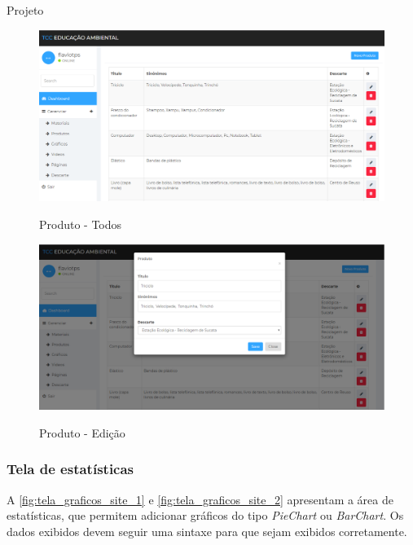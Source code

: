 \documentclass[
	12pt,				%
	openany,			%
	twoside,			%
	a4paper,			%
	english,			%
	french,				%
	spanish,			%
	brazil				%
	]{abntex2}
\begin{document}
\begin{chapter}{Projeto}
\begin{figure}[h]
\centering
   \caption{Produto - Todos}
   \includegraphics[scale=0.45]{media/tela_produto_site_1.png}
     \label{fig:tela_produto_site_1}
\end{figure}

\begin{figure}[h]
\centering
   \caption{Produto - Edição}
   \includegraphics[scale=0.40]{media/tela_produto_site_2.png}
     \label{fig:tela_produto_site_2}
\end{figure}

\newpage
\subsubsection{Tela de estatísticas} \label{tela_stats}
A \autoref{fig:tela_graficos_site_1} e \autoref{fig:tela_graficos_site_2} apresentam a área de estatísticas, que permitem adicionar gráficos do tipo \textit{PieChart} ou \textit{BarChart}. Os dados exibidos devem seguir uma sintaxe para que sejam exibidos corretamente.


\end{chapter}
\end{document}
